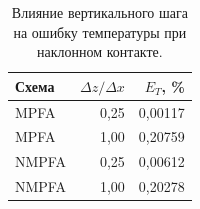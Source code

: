 \begin{table}[htbp]
\centering\small
\caption{Влияние вертикального шага на ошибку температуры при наклонном контакте.}\label{tab:contact-diagnostics}
\begin{tabular}{lrr}
\toprule
Схема & $\Delta z/\Delta x$ & $E_T$, \% \\
\midrule
MPFA & 0,25 & 0,00117 \\
MPFA & 1,00 & 0,20759 \\
NMPFA & 0,25 & 0,00612 \\
NMPFA & 1,00 & 0,20278 \\
\bottomrule
\end{tabular}
\end{table}
